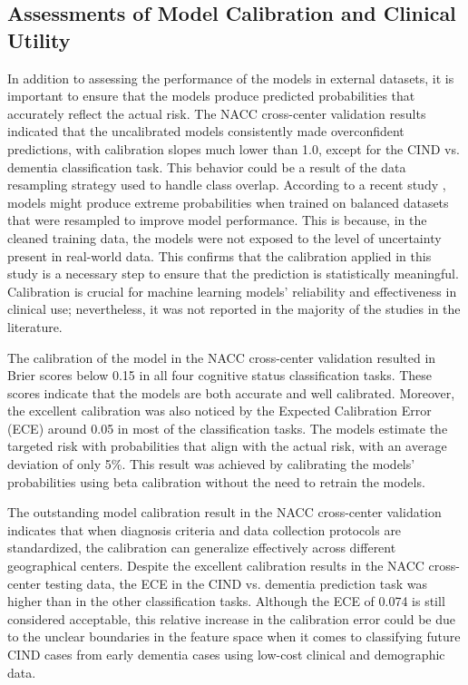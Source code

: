 \subsection{Assessments of Model Calibration and Clinical Utility}
In addition to assessing the performance of the models in external datasets, it is important to ensure that the models produce predicted probabilities that accurately reflect the actual risk. The NACC cross-center validation results indicated that the uncalibrated models consistently made overconfident predictions, with calibration slopes much lower than 1.0, except for the CIND vs. dementia classification task. This behavior could be a result of the data resampling strategy used to handle class overlap. According to a recent study \cite{Piccininni2024Understanding}, models might produce extreme probabilities when trained on balanced datasets that were resampled to improve model performance. This is because, in the cleaned training data, the models were not exposed to the level of uncertainty present in real-world data. This confirms that the calibration applied in this study is a necessary step to ensure that the prediction is statistically meaningful. Calibration is crucial for machine learning models' reliability and effectiveness in clinical use; nevertheless, it was not reported in the majority of the studies in the literature.

The calibration of the model in the NACC cross-center validation resulted in Brier scores below 0.15 in all four cognitive status classification tasks. These scores indicate that the models are both accurate and well calibrated. Moreover, the excellent calibration was also noticed by the Expected Calibration Error (\acrshort{ECE}) around 0.05 in most of the classification tasks. The models estimate the targeted risk with probabilities that align with the actual risk, with an average deviation of only 5\%. This result was achieved by calibrating the models' probabilities using beta calibration without the need to retrain the models. 

The outstanding model calibration result in the NACC cross-center validation indicates that when diagnosis criteria and data collection protocols are standardized, the calibration can generalize effectively across different geographical centers. Despite the excellent calibration results in the NACC cross-center testing data, the ECE in the CIND vs. dementia prediction task was higher than in the other classification tasks. Although the ECE of 0.074 is still considered acceptable, this relative increase in the calibration error could be due to the unclear boundaries in the feature space when it comes to classifying future CIND cases from early dementia cases using low-cost clinical and demographic data.

